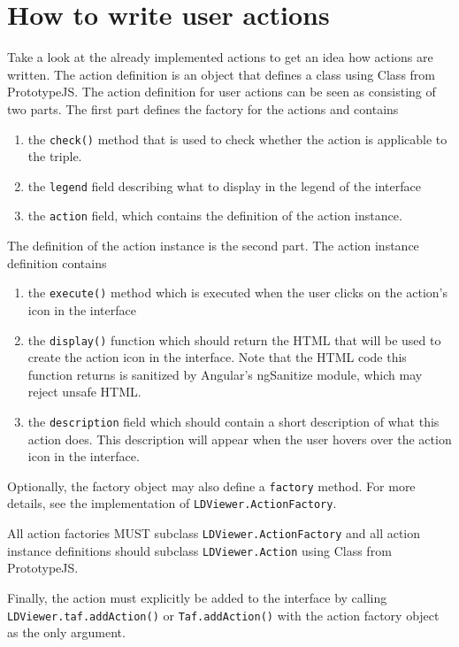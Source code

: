 \documentclass{article}
\begin{document}
\section{How to write user actions}
Take a look at the already implemented actions to get an idea how actions are written.
The action definition is an object that defines a class using Class from PrototypeJS.
The action definition for user actions can be seen as consisting of two parts. The first part defines the factory for the actions and contains 
\begin{enumerate}
\item the \texttt{check()} method that is used to check whether the action is applicable to the triple.
\item the \texttt{legend} field describing what to display in the legend of the interface
\item the \texttt{action} field, which contains the definition of the action instance.
\end{enumerate}
The definition of the action instance is the second part.
The action instance definition contains 
\begin{enumerate}
\item the \texttt{execute()} method which is executed when the user clicks on the action's icon in the interface
\item the \texttt{display()} function which should return the HTML that will be used to create the action icon in the interface. Note that the HTML code this function returns is sanitized by Angular's ngSanitize module, which may reject unsafe HTML.
\item the \texttt{description} field which should contain a short description of what this action does. This description will appear when the user hovers over the action icon in the interface.
\end{enumerate}
Optionally, the factory object may also define a \texttt{factory} method.
For more details, see the implementation of \texttt{LDViewer.ActionFactory}.

All action factories MUST subclass \texttt{LDViewer.ActionFactory} and all action instance definitions should subclass \texttt{LDViewer.Action} using Class from PrototypeJS.

Finally, the action must explicitly be added to the interface by calling \texttt{LDViewer.taf.addAction()} or \texttt{Taf.addAction()} with the action factory object as the only argument.
\end{document}
